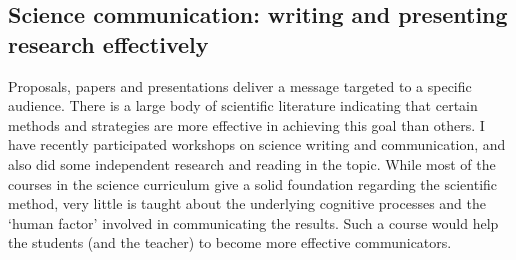 \subsection{Science communication: writing and presenting research effectively}
Proposals, papers and presentations deliver a message targeted to a specific audience. There is a large body of scientific literature indicating that certain methods and strategies are more effective in achieving this goal than others. I have recently participated workshops on science writing and communication, and also did some independent research and reading in the topic. While most of the courses in the science curriculum give a solid foundation regarding the scientific method, very little is taught about the underlying cognitive processes and the `human factor' involved in communicating the results. Such a course would help the students (and the teacher) to become more effective communicators.
\vspace{0.5pc}

